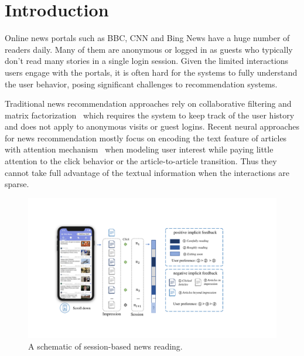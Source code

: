 \section{Introduction}
Online news portals such as BBC, CNN and Bing News have a huge number 
of readers daily. Many of them are anonymous or logged in as guests who typically don't read many stories in a single login session.
Given the limited interactions users engage with the portals, it is often 
hard for the systems to fully understand the user behavior, posing significant challenges to recommendation systems. 

Traditional news recommendation approaches rely on collaborative filtering and matrix factorization~\cite{cheng2016wide, guodeepfm2017, wang2018modeling, ge2020graph, hu2020graph, xie2020deep}
which requires the system to keep track of the user history and does not apply to anonymous 
visits or guest logins. 
Recent neural approaches for news recommendation mostly focus on encoding the text feature of articles with 
attention mechanism~\cite{wang2018dkn, zhu2019dan, wu_neural_2019-1, wu2019npa, wang2020fine, wu2020CPRS} 
when modeling user interest while paying little attention to the click behavior or 
the article-to-article transition. Thus they cannot take full advantage of the textual information 
when the interactions are sparse.

\begin{figure}[th]
    \centering
    \includegraphics[width=\columnwidth]{fig/stream.pdf}
    \caption{A schematic of session-based news reading. 
}
    \label{fig:session}
\end{figure}

